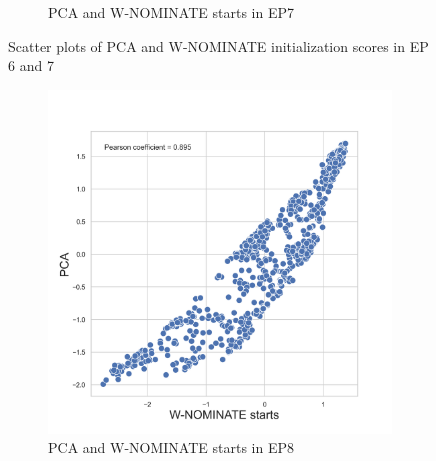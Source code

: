 \documentclass[a4paper,12pt]{report}
\begin{document}
\begin{figure}[H]
\begin{subfigure}[b]{0.48\textwidth}
                        \caption{PCA and W-NOMINATE starts in EP7}
                        \label{fig:pca_SCATTER_7}
                    \end{subfigure}
                    \caption
                    {Scatter plots of PCA and W-NOMINATE initialization scores in EP 6 and 7}
                    \label{fig:pca_scatter67}
                \end{figure}
                \begin{figure}[H]
                    \centering
                    \begin{subfigure}[b]{0.48\textwidth}
                        \centering
                        \includegraphics[width=\textwidth]{Graphs/Scatterstartspca8}
                        \caption{PCA and W-NOMINATE starts in EP8}
                        \label{fig:pca_SCATTER_8}
                    \end{subfigure}
                    \hfill
                    \begin{subfigure}[b]{0.48\textwidth}
                        \centering

\end{subfigure}
\end{figure}
\end{document}
